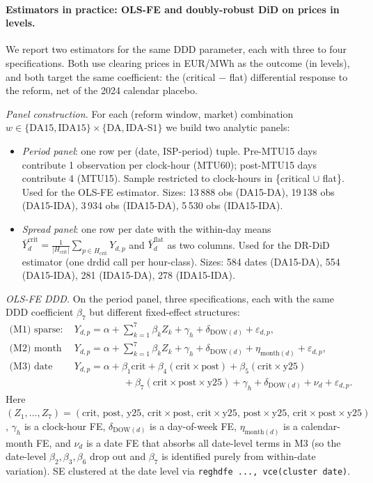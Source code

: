 \documentclass[11pt,a4paper]{article}
\begin{document}
\paragraph{Estimators in practice: OLS-FE and doubly-robust DiD on prices in levels.}
We report two estimators for the same DDD parameter, each with three to four specifications. Both use clearing prices in EUR/MWh as the outcome (in levels), and both target the same coefficient: the (critical $-$ flat) differential response to the reform, net of the 2024 calendar placebo.

\textit{Panel construction.} For each (reform window, market) combination $w \in \{\text{DA15}, \text{IDA15}\} \times \{\text{DA}, \text{IDA-S1}\}$ we build two analytic panels:
\begin{itemize}
\item \emph{Period panel}: one row per (date, ISP-period) tuple. Pre-MTU15 days contribute 1 observation per clock-hour (MTU60); post-MTU15 days contribute 4 (MTU15). Sample restricted to clock-hours in \{critical $\cup$ flat\}. Used for the OLS-FE estimator. Sizes: 13\,888 obs (DA15-DA), 19\,138 obs (DA15-IDA), 3\,934 obs (IDA15-DA), 5\,530 obs (IDA15-IDA).
\item \emph{Spread panel}: one row per date with the within-day means $\bar Y^{\text{crit}}_d = \frac{1}{|H_{\text{crit}}|}\sum_{p \in H_{\text{crit}}} Y_{d,p}$ and $\bar Y^{\text{flat}}_d$ as two columns. Used for the DR-DiD estimator (one drdid call per hour-class). Sizes: 584 dates (DA15-DA), 554 (DA15-IDA), 281 (IDA15-DA), 278 (IDA15-IDA).
\end{itemize}

\textit{OLS-FE DDD.} On the period panel, three specifications, each with the same DDD coefficient $\beta_7$ but different fixed-effect structures:
\begin{align*}
\text{(M1) sparse:}\quad & Y_{d,p} = \alpha + \sum_{k=1}^{7} \beta_k Z_k + \gamma_h + \delta_{\text{DOW}(d)} + \varepsilon_{d,p}, \\
\text{(M2) month FE:}\quad & Y_{d,p} = \alpha + \sum_{k=1}^{7} \beta_k Z_k + \gamma_h + \delta_{\text{DOW}(d)} + \eta_{\text{month}(d)} + \varepsilon_{d,p}, \\
\text{(M3) date FE:}\quad & Y_{d,p} = \alpha + \beta_1 \text{crit} + \beta_4 (\text{crit}\!\times\!\text{post}) + \beta_5 (\text{crit}\!\times\!\text{y25}) \\
& \qquad\qquad\quad + \beta_7 (\text{crit}\!\times\!\text{post}\!\times\!\text{y25}) + \gamma_h + \delta_{\text{DOW}(d)} + \nu_d + \varepsilon_{d,p}.
\end{align*}
Here $(Z_1,\ldots,Z_7) = (\text{crit},\,\text{post},\,\text{y25},\,\text{crit}\!\times\!\text{post},\,\text{crit}\!\times\!\text{y25},\,\text{post}\!\times\!\text{y25},\,\text{crit}\!\times\!\text{post}\!\times\!\text{y25})$, $\gamma_h$ is a clock-hour FE, $\delta_{\text{DOW}(d)}$ is a day-of-week FE, $\eta_{\text{month}(d)}$ is a calendar-month FE, and $\nu_d$ is a date FE that absorbs all date-level terms in M3 (so the date-level $\beta_2,\beta_3,\beta_6$ drop out and $\beta_7$ is identified purely from within-date variation). SE clustered at the date level via \texttt{reghdfe ..., vce(cluster date)}.
\end{document}
